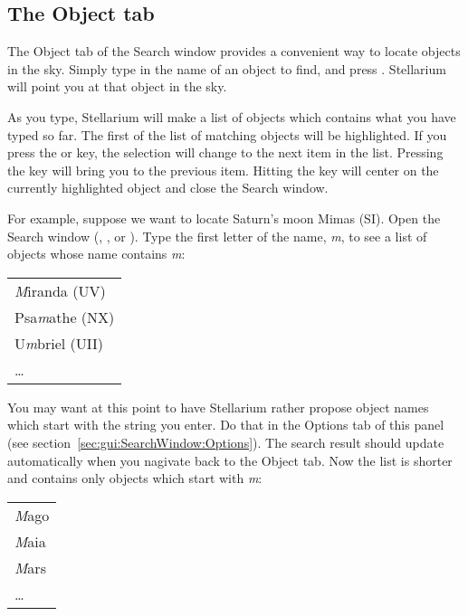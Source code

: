 \subsection{The Object tab}
\label{sec:gui:SearchWindow:Object}
The Object tab of the Search window provides a convenient way to locate objects
in the sky. Simply type in the name of an object to find, and press
\key{\return}. Stellarium will point you at that object in the sky.

As you type, Stellarium will make a list of objects which contains 
what you have typed so far. The first of the list of matching objects
will be highlighted. If you press the \key{\tab} or \key{\arrowkeydown} key,
the selection will change to the next item in the list.
Pressing the \key{\arrowkeyup} key will bring you to the previous item.
Hitting the \key{\return} key will center on the
currently highlighted object and close the Search window.

For example, suppose we want to locate Saturn's moon Mimas (SI).
Open the Search window (, , or ).
Type the first letter of the name, \emph{m}, to see a list
of objects whose name contains \emph{m}:
\begin{center}
\begin{tabular}{l}
        \emph{M}iranda (UV)\\
        Psa\emph{m}athe (NX)\\
        U\emph{m}briel (UII)\\
        \ldots\\
\end{tabular}
\end{center}

\noindent You may want at this point to have Stellarium rather propose object
names which start with the string you enter. Do that in the Options tab
of this panel (see section~\ref{sec:gui:SearchWindow:Options}).
The search result should update automatically
when you nagivate back to the Object tab.
Now the list is shorter and contains only objects which start
with \emph{m}:
\begin{center}
\begin{tabular}{l}
        \emph{M}ago\\
        \emph{M}aia\\
        \emph{M}ars\\
        \ldots\\
\end{tabular}
\end{center}

